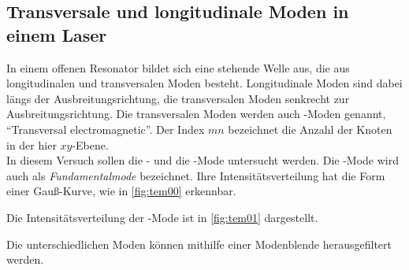 \subsection{Transversale und longitudinale Moden in einem Laser}
\label{sec:moden}

    In einem offenen Resonator bildet sich eine stehende Welle aus,
    die aus longitudinalen und transversalen Moden besteht.
    Longitudinale Moden sind dabei längs der Ausbreitungsrichtung,
    die transversalen Moden senkrecht zur Ausbreitungsrichtung.
    Die transversalen Moden werden auch -Moden genannt,
    \enquote{Transversal electromagnetic}.
    Der Index $mn$ bezeichnet die Anzahl der Knoten in der hier $xy$-Ebene.\\
    In diesem Versuch sollen die - und die -Mode untersucht werden.
    Die -Mode wird auch als \textit{Fundamentalmode} bezeichnet.
    Ihre Intensitätsverteilung hat die Form einer Gauß-Kurve,
    wie in \autoref{fig:tem00} erkennbar.

    Die Intensitätsverteilung der -Mode ist in \autoref{fig:tem01} dargestellt.

    Die unterschiedlichen Moden können mithilfe einer Modenblende herausgefiltert werden.

